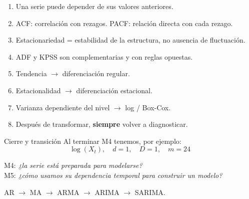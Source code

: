 \begin{frame}
\begin{recordar}
\begin{enumerate}
  \item Una serie puede depender de sus valores anteriores.
  \item ACF: correlación con rezagos. PACF: relación directa con cada rezago.
  \item Estacionariedad = estabilidad de la estructura, no ausencia de fluctuación.
  \item ADF y KPSS son complementarias y con reglas opuestas.
  \item Tendencia $\rightarrow$ diferenciación regular.
  \item Estacionalidad $\rightarrow$ diferenciación estacional.
  \item Varianza dependiente del nivel $\rightarrow$ log / Box-Cox.
  \item Después de transformar, \textbf{siempre} volver a diagnosticar.
\end{enumerate}
\end{recordar}
\end{frame}

\begin{frame}{Cierre y transición}
Al terminar M4 tenemos, por ejemplo:
\[
\boxed{\log(X_t),\quad d=1,\quad D=1,\quad m=24}
\]
\begin{center}
M4: \emph{¿la serie está preparada para modelarse?}\\[0.3em]
\fl\quad M5: \emph{¿cómo usamos su dependencia temporal para construir un modelo?}
\end{center}
AR $\rightarrow$ MA $\rightarrow$ ARMA $\rightarrow$ ARIMA $\rightarrow$ SARIMA.
\end{frame}


